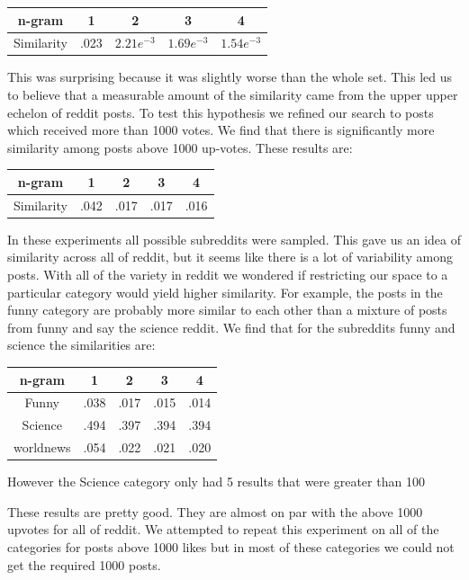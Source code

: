 \documentclass[12pt]{article}
\numberwithin{equation}{section}
\begin{document}
\begin{table}[h!]
	  \begin{tabular}{c | c c c c}
	  n-gram & 1 & 2 & 3 & 4\\
	  \hline
	  Similarity & .023 & $2.21e^{-3}$ & $1.69e^{-3}$ & $1.54e^{-3}$
	  \end{tabular}
	\end{table}
	This was surprising because it was slightly worse than the whole set.  This led us to believe that a measurable amount of the similarity came from the upper upper echelon of reddit posts.  To test this hypothesis we refined our search to posts which received more than 1000 votes.  We find that there is significantly more similarity among posts above 1000 up-votes.  These results are:\newline
	
	\begin{table}[h!]
	  \begin{tabular}{c | c c c c}
	  n-gram & 1 & 2 & 3 & 4\\
	  \hline
	  Similarity & .042 & .017 & .017 & .016
	  \end{tabular}
	\end{table}
	
	In these experiments all possible subreddits were sampled.  This gave us an idea of similarity across all of reddit, but it seems like there is a lot of variability among posts.  With all of the variety in reddit we wondered if restricting our space to a particular category would yield higher similarity.  For example, the posts in the funny category are probably more similar to each other than a mixture of posts from funny and say the science reddit.  We find that for the subreddits funny and science the similarities are:
	
		\begin{table}[h!]
	  \begin{tabular}{c | c c c c}
	  n-gram & 1 & 2 & 3 & 4\\
	  \hline
	  Funny & .038 & .017 & .015 & .014\\
	  Science & .494 & .397 & .394 & .394\\
	  worldnews & .054 & .022 & .021 & .020
	  \end{tabular}
	\end{table}
	However the Science category only had 5 results that were greater than 100
	
These results are pretty good.  They are almost on par with the above 1000 upvotes for all of reddit.   We attempted to repeat this experiment on all of the categories for posts above 1000 likes but in most of these categories we could not get the required 1000 posts.\newline
\end{document}
